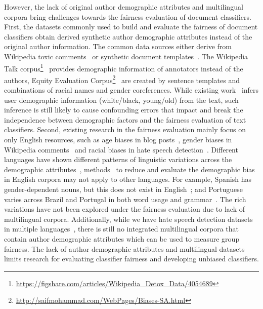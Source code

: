 However, the lack of original author demographic attributes and multilingual corpora bring challenges towards the fairness evaluation of document classifiers.
First, the datasets commonly used to build and evaluate the fairness of document classifiers obtain derived synthetic author demographic attributes instead of the original author information.
The common data sources either derive from Wikipedia toxic comments~\cite{dixon2018measuring,park2018reducing,garg2019counterfactual} or synthetic document templates~\cite{kiritchenko2018examining,park2018reducing}.
The Wikipedia Talk corpus\footnote{\url{https://figshare.com/articles/Wikipedia_Detox_Data/4054689}}~\cite{wulczyn2017ex} provides demographic information of annotators instead of the authors, Equity Evaluation Corpus\footnote{\url{http://saifmohammad.com/WebPages/Biases-SA.html}}~\cite{kiritchenko2018examining} are created by sentence templates and combinations of racial names and gender coreferences.
While existing work~\cite{davidson2019racial,diaz2018addressing} infers user demographic information (white/black, young/old) from the text, such inference is still likely to cause confounding errors that impact and break the independence between demographic factors and the fairness evaluation of text classifiers.
Second, existing research in the fairness evaluation mainly focus on only English resources, such as age biases in blog posts~\cite{diaz2018addressing}, gender biases in Wikipedia comments~\cite{dixon2018measuring} and racial biases in hate speech detection~\cite{davidson2019racial}.
Different languages have shown different patterns of linguistic variations across the demographic attributes~\cite{johannsen2015cross,huang2019neural}, methods~\cite{zhao2017men,park2018reducing} to reduce and evaluate the demographic bias in English corpora may not apply to other languages. 
For example, Spanish has gender-dependent nouns, but this does not exist in English~\cite{sun2019mitigating}; and Portuguese varies across Brazil and Portugal in both word usage and grammar~\cite{maier2014language}.
The rich variations have not been explored under the fairness evaluation due to lack of multilingual corpora.
Additionally, while we have hate speech detection datasets in multiple languages~\cite{waseem2016hateful,sanguinetti2018italian,ptaszynski2017learning,basile2019semeval,fortuna2019hierarchically}, there is still no integrated multilingual corpora that contain author demographic attributes which can be used to measure group fairness.
The lack of author demographic attributes and multilingual datasets limits research for evaluating classifier fairness and developing unbiased classifiers.



